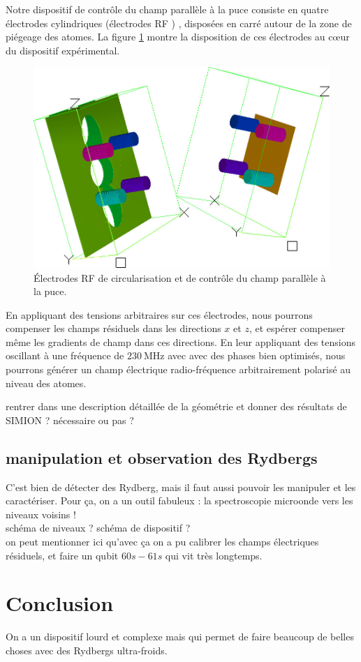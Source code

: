 Notre dispositif de contrôle du champ parallèle à la puce consiste en quatre électrodes cylindriques (\og électrodes RF \fg{}) , disposées en carré autour de la zone de piégeage des atomes.
La figure \ref{fig:RF_ELECTRODES} montre la disposition de ces électrodes au c\oe ur du dispositif expérimental.
%
\begin{figure}[h]
\centering
\includegraphics[width=\linewidth]{figures/RF_electrodes}
\caption[Électrodes de circularisation et de contrôle du champ parallèle]{
Électrodes \og RF \fg{} de circularisation et de contrôle du champ parallèle à la puce.
}
\label{fig:RF_ELECTRODES}
\end{figure}
%
En appliquant des tensions arbitraires sur ces électrodes, nous pourrons compenser les champs résiduels dans les directions $x$ et $z$, et espérer compenser même les gradients de champ dans ces directions.
En leur appliquant des tensions oscillant à une fréquence de $\SI{230}{\MHz}$ avec avec des phases bien optimisés, nous pourrons générer un champ électrique radio-fréquence arbitrairement polarisé au niveau des atomes.

\bigskip
\noindent rentrer dans une description détaillée de la géométrie et donner des résultats de SIMION ? nécessaire ou pas ?


\newpage
	\subsection{manipulation et observation des Rydbergs}
\noindent C'est bien de détecter des Rydberg, mais il faut aussi pouvoir les manipuler et les caractériser.
Pour ça, on a un outil fabuleux : la spectroscopie microonde vers les niveaux voisins ! \\
schéma de niveaux ? schéma de dispositif ? \\
on peut mentionner ici qu'avec ça on a pu calibrer les champs électriques résiduels, et faire un qubit $60s-61s$ qui vit très longtemps.

\section*{Conclusion}
On a un dispositif lourd et complexe mais qui permet de faire beaucoup de belles choses avec des Rydbergs ultra-froids.